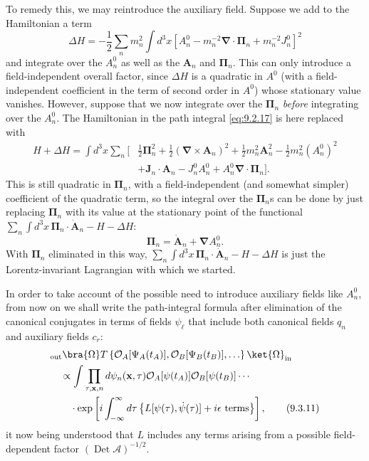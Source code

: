 To remedy this, we may reintroduce the auxiliary field. Suppose we add to the
Hamiltonian a term
\[
\Delta H=-\frac12\sum_n m_n^2\int d^3x
 \left[A_n^0-m_n^{-2}\boldsymbol\nabla\cdot\boldsymbol\Pi_n
 +m_n^{-2}J_n^0\right]^2
\]
and integrate over the $A_n^0$ as well as the $\mathbf A_n$ and
$\boldsymbol\Pi_n$. This can only introduce a field-independent overall
factor, since $\Delta H$ is a quadratic in $A^0$ (with a field-independent
coefficient in the term of second order in $A^0$) whose stationary value
vanishes. However, suppose that we now integrate over the $\boldsymbol\Pi_n$
\emph{before} integrating over the $A_n^0$. The Hamiltonian in the path
integral \eqref{eq:9.2.17} is here replaced with
\begin{align*}
H+\Delta H=\int d^3x\sum_n\biggl[&\frac12\boldsymbol\Pi_n^2
 +\frac12(\boldsymbol\nabla\times\mathbf A_n)^2
 +\frac12m_n^2\mathbf A_n^2-\frac12m_n^2(A_n^0)^2
\\
&+\mathbf J_n\cdot\mathbf A_n-J_n^0A_n^0
 +A_n^0\boldsymbol\nabla\cdot\boldsymbol\Pi_n\biggr].
\end{align*}
This is still quadratic in $\boldsymbol\Pi_n$, with a field-independent (and
somewhat simpler) coefficient of the quadratic term, so the integral over the
$\boldsymbol\Pi_n$s can be done by just replacing $\boldsymbol\Pi_n$ with its
value at the stationary point of the functional
$\sum_n\int d^3x\,\boldsymbol\Pi_n\cdot\dot{\mathbf A}_n-H-\Delta H$:
\[
\boldsymbol\Pi_n=\dot{\mathbf A}_n+\boldsymbol\nabla A_n^0.
\]
With $\boldsymbol\Pi_n$ eliminated in this way,
$\sum_n\int d^3x\,\boldsymbol\Pi_n\cdot\dot{\mathbf A}_n-H-\Delta H$ is just
the Lorentz-invariant Lagrangian with which we started.

In order to take account of the possible need to introduce auxiliary fields
like $A_n^0$, from now on we shall write the path-integral formula after
elimination of the canonical conjugates in terms of fields $\psi_\ell$ that
include both canonical fields $q_n$ and auxiliary fields $c_r$:
\begin{align}
&{}_{\mathrm{out}}\bra{\Omega}T\left\{
 \mathcal O_A[\Psi_A(t_A)],\mathcal O_B[\Psi_B(t_B)],\ldots\right\}
 \ket{\Omega}_{\mathrm{in}}
\notag\\
&\quad\propto\int\prod_{\tau,\mathbf{x},n}d\psi_n(\mathbf{x},\tau)
 \mathcal O_A[\psi(t_A)]\mathcal O_B[\psi(t_B)]\cdots
\notag\\
&\qquad\cdot\exp\left[i\int_{-\infty}^{\infty}d\tau
 \left\{L[\psi(\tau),\dot\psi(\tau)]+i\epsilon\text{ terms}\right\}\right],
\tag{9.3.11}\label{eq:9.3.11}
\end{align}
it now being understood that $L$ includes any terms arising from a possible
field-dependent factor $(\operatorname{Det}\mathcal A)^{-1/2}$.

